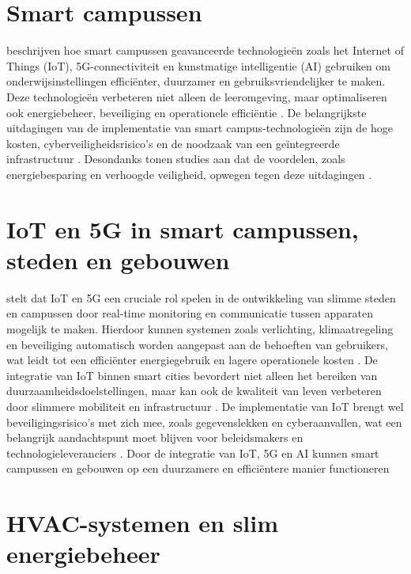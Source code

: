 \section{Smart campussen}
\textcites{Min_Allah_2020,AbuAlnaaj2016,Ahmed2022} beschrijven hoe smart campussen geavanceerde technologieën zoals het Internet of Things (IoT), 5G-connectiviteit en kunstmatige intelligentie (AI) gebruiken om onderwijsinstellingen efficiënter, duurzamer en gebruiksvriendelijker te maken. Deze technologieën verbeteren niet alleen de leeromgeving, maar optimaliseren ook energiebeheer, beveiliging en operationele efficiëntie \autocite{Correia2022}. De belangrijkste uitdagingen van de implementatie van smart campus-technologieën zijn de hoge kosten, cyberveiligheidsrisico’s en de noodzaak van een geïntegreerde infrastructuur \autocite{Liu_2022}. Desondanks tonen studies aan dat de voordelen, zoals energiebesparing en verhoogde veiligheid, opwegen tegen deze uitdagingen \autocite{AbuAlnaaj2016}.





\section{IoT en 5G in smart campussen, steden en gebouwen}

\textcite{Bilardo_2021} stelt dat IoT en 5G een cruciale rol spelen in de ontwikkeling van slimme steden en campussen door real-time monitoring en communicatie tussen apparaten mogelijk te maken. Hierdoor kunnen systemen zoals verlichting, klimaatregeling en beveiliging automatisch worden aangepast aan de behoeften van gebruikers, wat leidt tot een efficiënter energiegebruik en lagere operationele kosten \autocite{Polin2023}. De integratie van IoT binnen smart cities bevordert niet alleen het bereiken van duurzaamheidsdoelstellingen, maar kan ook de kwaliteit van leven verbeteren door slimmere mobiliteit en infrastructuur \autocite{Chew2020}. De implementatie van IoT brengt wel beveiligingsrisico’s met zich mee, zoals gegevenslekken en cyberaanvallen, wat een belangrijk aandachtspunt moet blijven voor beleidsmakers en technologieleveranciers \autocite{Trivedi2017}.
Door de integratie van IoT, 5G en AI kunnen smart campussen en gebouwen op een duurzamere en efficiëntere manier functioneren





\section{HVAC-systemen en slim energiebeheer}

